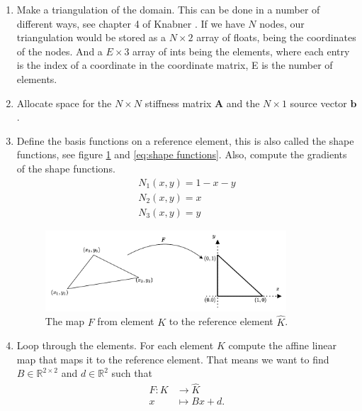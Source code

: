 \documentclass[../Main/main.tex]{subfiles}
\begin{document}
	\begin{enumerate}
		\item Make a triangulation of the domain. This can be done in a number of different ways, see chapter 4 of Knabner \cite{Knabner}. If we have $N$ nodes, our triangulation would be stored as a $N \times 2$ array of floats, being the coordinates of the nodes. And a $E\times 3$ array of ints being the elements, where each entry is the index of a coordinate in the coordinate matrix, E is the number of elements.
		\item Allocate space for the $N \times N$ stiffness matrix $\bm{A}$ and the $N \times 1$ source vector $\bm{b}$.
		\item Define the basis functions on a reference element, this is also called the shape functions, see figure \ref{fig:reference element} and \eqref{eq:shape functions}. Also, compute the gradients of the shape functions. 
		\begin{equation}
			\begin{gathered}\label{eq:shape functions}
				N_1(x,y) = 1-x-y\\
				N_2(x,y) = x\\
				N_3(x,y) = y
			\end{gathered}
		\end{equation}
		\begin{figure}[H]
			\centering
			\includegraphics[width=0.85\textwidth]{reference element.pdf}
			\caption{The map $F$ from element $K$ to the reference element $\hat{K}$.}
			\label{fig:reference element}
		\end{figure}
		\item Loop through the elements. For each element $K$ compute the affine linear map that maps it to the reference element. That means we want to find $B\in \mathbb{R}^{2\times 2}$ and $d\in \mathbb{R}^2$ such that 
		\begin{equation}
			\begin{aligned}
				F: K &\rightarrow \hat{K}\\
				x &\mapsto B x + d.
			\end{aligned}
		\end{equation}

\end{enumerate}
\end{document}
